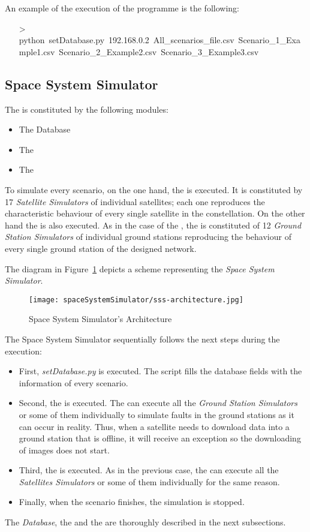 An example of the execution of the programme is the following:
\begin{itemize}
\item[>] python~setDatabase.py~192.168.0.2~All\_scenarios\_file.csv~Scenario\_1\_Example1.csv~Scenario\_2\_Example2.csv~Scenario\_3\_Example3.csv
\end{itemize}


\subsection{Space System Simulator}

The \sss is constituted by the following modules:
\begin{itemize}
\item The Database
\item The \satss
\item The \gsss
\end{itemize}


To simulate every scenario, on the one hand, the \satss is executed. It is
constituted by 17 \emph{Satellite Simulators} of individual satellites; each one
reproduces the characteristic behaviour of every single satellite in the
constellation.
On the other hand the \gsss is also executed. As in the case of the \satss, the
\gsss is constituted of 12 \emph{Ground Station Simulators} of individual ground
stations reproducing the behaviour of every single ground station of the
designed network.

The diagram in Figure~\ref{fig:sss-architecture} depicts a scheme
representing the \emph{Space System Simulator}.

\begin{figure}[!h]
\begin{center}
\texttt{[image: spaceSystemSimulator/sss-architecture.jpg]}
\caption{Space System Simulator's Architecture}
\label{fig:sss-architecture}
\end{center}
\end{figure}

The Space System Simulator sequentially follows the next steps during the
execution:
\begin{itemize}

\item First, \emph{setDatabase.py} is executed. The script fills the database fields with the information of every scenario.
\item Second, the \gsss is executed. The \gsss can execute all the \emph{Ground Station Simulators} or some of them individually to simulate faults in the ground stations as it can occur in reality. Thus, when a satellite needs to download data into a ground station that is offline, it will receive an exception so the downloading of images does not start.
\item Third, the \satss is executed. As in the previous case, the \satss can execute all the \emph{Satellites Simulators} or some of them individually for the same reason.
\item Finally, when the scenario finishes, the simulation is stopped.
\end{itemize}
The \emph{Database}, the \satss and the \gsss are thoroughly described in the
next subsections.

